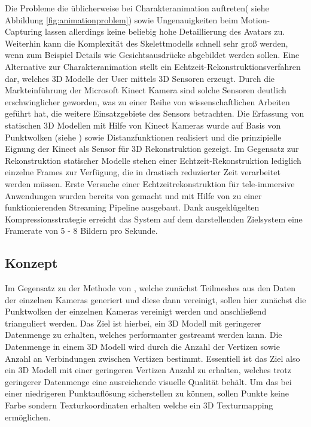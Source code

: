 Die Probleme die üblicherweise bei Charakteranimation auftreten( siehe Abbildung 
\ref{fig:animationproblem}) sowie Ungenauigkeiten beim Motion-Capturing lassen 
allerdings keine beliebig hohe Detaillierung des Avatars zu. Weiterhin kann die 
Komplexität des Skelettmodells schnell sehr groß werden, wenn zum Beispiel 
Details wie Gesichtsausdrücke abgebildet werden sollen. Eine Alternative zur 
Charakteranimation stellt ein Echtzeit-Rekonstruktionsverfahren dar, welches 
3D Modelle der User mittels 3D Sensoren erzeugt. Durch die Markteinführung der 
Microsoft Kinect Kamera sind solche Sensoren deutlich erschwinglicher geworden, 
was zu einer Reihe von wissenschaftlichen Arbeiten geführt hat, die weitere 
Einsatzgebiete des Sensors betrachten. Die Erfassung von statischen 3D Modellen 
mit Hilfe von Kinect Kameras wurde auf Basis von Punktwolken 
(siehe \cite{tong2012scanning}) sowie Distanzfunktionen 
\cite{Izadi:2011:KRR:2047196.2047270} realisiert und die prinzipielle Eignung 
der Kinect als Sensor für 3D Rekonstruktion gezeigt. Im Gegensatz zur 
Rekonstruktion statischer Modelle stehen einer Echtzeit-Rekonstruktion 
lediglich einzelne Frames zur Verfügung, die in drastisch reduzierter Zeit 
verarbeitet werden müssen. Erste Versuche einer Echtzeitrekonstruktion für 
tele-immersive Anwendungen wurden bereits von \cite{alexiadis2013real} gemacht 
und mit Hilfe von \cite{mekuria2013teleimmersion} zu einer funktionierenden 
Streaming Pipeline ausgebaut. Dank ausgeklügelten Kompressionsstrategie erreicht 
das System auf dem darstellenden Zielsystem eine Framerate von 5 - 8 Bildern 
pro Sekunde.

\subsection{Konzept}
Im Gegensatz zu der Methode von \cite{alexiadis2013real}, welche zunächst 
Teilmeshes aus den Daten der einzelnen Kameras generiert und diese dann 
vereinigt, sollen hier zunächst die Punktwolken der einzelnen Kameras vereinigt 
werden und anschließend trianguliert werden. Das Ziel ist hierbei, ein 3D Modell 
mit geringerer Datenmenge zu erhalten, welches performanter gestreamt werden 
kann. Die Datenmenge in einem 3D Modell wird durch die Anzahl der Vertizen sowie 
Anzahl an Verbindungen zwischen Vertizen bestimmt. Essentiell ist das Ziel also 
ein 3D Modell mit einer geringeren Vertizen Anzahl zu erhalten, welches trotz 
geringerer Datenmenge eine ausreichende visuelle Qualität behält. Um das bei 
einer niedrigeren Punktauflösung sicherstellen zu können, sollen Punkte keine 
Farbe sondern Texturkoordinaten erhalten welche ein 3D Texturmapping ermöglichen.


